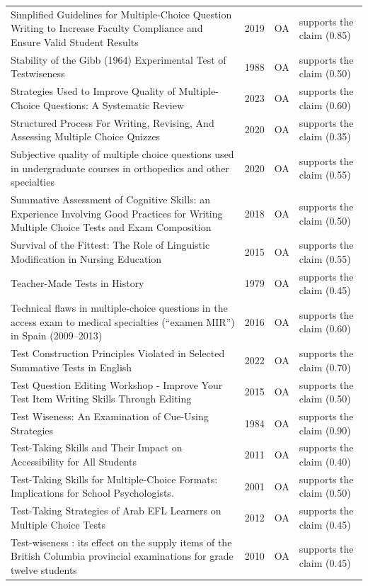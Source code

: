 \begin{longtable}{@{}%
  >{\raggedright\arraybackslash}p{}c%
  >{\raggedright\arraybackslash}p{}%
  >{\raggedright\arraybackslash}p{}@{}}
Simplified Guidelines for Multiple-Choice Question Writing to Increase Faculty Compliance and Ensure Valid Student Results & 2019 & OA & supports the claim (0.85) \\
Stability of the Gibb (1964) Experimental Test of Testwiseness & 1988 & OA & supports the claim (0.50) \\
Strategies Used to Improve Quality of Multiple-Choice Questions: A Systematic Review & 2023 & OA & supports the claim (0.60) \\
Structured Process For Writing, Revising, And Assessing Multiple Choice Quizzes & 2020 & OA & supports the claim (0.35) \\
Subjective quality of multiple choice questions used in undergraduate courses in orthopedics and other specialties & 2020 & OA & supports the claim (0.55) \\
Summative Assessment of Cognitive Skills: an Experience Involving Good Practices for Writing Multiple Choice Tests and Exam Composition & 2018 & OA & supports the claim (0.50) \\
Survival of the Fittest: The Role of Linguistic Modification in Nursing Education & 2015 & OA & supports the claim (0.55) \\
Teacher-Made Tests in History & 1979 & OA & supports the claim (0.45) \\
Technical flaws in multiple-choice questions in the access exam to medical specialties (``examen MIR'') in Spain (2009--2013) & 2016 & OA & supports the claim (0.60) \\
Test Construction Principles Violated in Selected Summative Tests in English & 2022 & OA & supports the claim (0.70) \\
Test Question Editing Workshop - Improve Your Test Item Writing Skills Through Editing & 2015 & OA & supports the claim (0.50) \\
Test Wiseness: An Examination of Cue-Using Strategies & 1984 & OA & supports the claim (0.90) \\
Test-Taking Skills and Their Impact on Accessibility for All Students & 2011 & OA & supports the claim (0.40) \\
Test-Taking Skills for Multiple-Choice Formats: Implications for School Psychologists. & 2001 & OA & supports the claim (0.50) \\
Test-Taking Strategies of Arab EFL Learners on Multiple Choice Tests & 2012 & OA & supports the claim (0.45) \\
Test-wiseness : its effect on the supply items of the British Columbia provincial examinations for grade twelve students & 2010 & OA & supports the claim (0.45) \\

\end{longtable}
